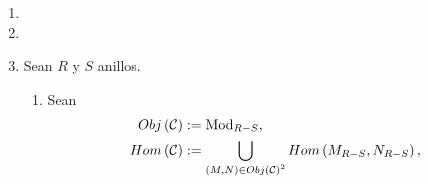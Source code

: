\documentclass{article}
\newcommand{\crdnlty}[1]{
	\left|#1\right|
}
\newcommand{\lrprth}[1]{
	\left(#1\right)
}
\newcommand{\lrbrack}[1]{
	\left\{#1\right\}
}
\newcommand{\fntuple}[3]{
	{\left({#1}_{#2}\right)}_{#2=1}^{#3}
}
\newcommand{\genmod}[2]{
	\left< #1\right>_{#2}
}
\newcommand{\ringmod}[3]{
	\if#3l
	{}_{#1}#2
	\else
	\if#3r
	#2_{#1}
	\fi
	\fi
}
\newcommand{\ringbimod}[4]{
	\if#4l
	{}_{#1-#2}#3
	\else
	\if#4r
	#3_{#1-#2}
	\else 
	\ifstrequal{#4}{lr}{
		{}_{#1}#3_{#2}
	}
	\fi
	\fi
}
\theoremstyle{definition}
\theoremstyle{plain}
\theoremstyle{plain}
\theoremstyle{definition}
\theoremstyle{definition}
\theoremstyle{definition}
\theoremstyle{definition}
\theoremstyle{definition}
\newtheorem{lem}{Lema}
\theoremstyle{definition}
\begin{document}
\begin{enumerate}[label=\textbf{Ej \arabic*.}]
\begin{proof}
\begin{proof}
\begin{align*}
			 \therefore\ & f\lrprth{\genmod{A}{R}} = \genmod{f(A)}{R}.
		\end{align*}
	\end{proof}
	\begin{lem}
		Sea $f:M\rightarrow N$ un epimorfismo de $R$-módulos a izquierda. Si $M\in\ringmod{R}{\text{mod}}{l}$ entonces $N\in\ringmod{R}{\text{mod}}{l}$.
	\end{lem}
	\begin{proof}
		Como $M\in\ringmod{R}{\text{mod}}{l}$ $\exists\ X\subseteq M$ finito tal que $M=\genmod{X}{R}$ y así
		\begin{align*}
			N&=f(M) && f\text{ es sobre}\\
			&=f\lrprth{\genmod{X}{R}}=\genmod{f(X)}{R} && \text{Lema 4}
		\end{align*}
	Y como $\crdnlty{f(X)}\leq\crdnlty{X}$ entonces $f(X)$ es finito. Por lo tanto $N\in\ringmod{R}{\text{mod}}{l}$.\\
	\end{proof}
	Así, como $\exists\ n\in\mathbb{N}\setminus\lrbrack{0}$ y $f:R^n\rightarrow M$ epimorfismo de $R$-módulos a izquierda, por el Lema 5 basta verificar que $R^n\in\ringmod{R}{\text{mod}}{l}$.\\
	Sean $e_j:=\lrprth{u_i^j}_{i=1}^n\in R^n$, donde
		\begin{equation*}
		u_i^j=\left\{
		\begin{tabular}{cc}
			$0_R$ & , $i\neq j$ \\
			$1_R$ & , $i=j$ 
		\end{tabular}
		\right. ,
	\end{equation*}
	$\forall\ j\in[1,n]$, y $E:=\lrbrack{e_1,\dotsc,e_n}$. Así si $\fntuple{r}{i}{n}\in R^n$, entonces $\fntuple{r}{i}{n}=\sum_{i=1}^{n}r_ie_i$, con lo cual $R^n=\genmod{E}{R}$. Por lo tanto $R^n\in\ringmod{R}{\text{mod}}{l}$.\\
\end{proof}
\item\item
\item Sean $R$ y $S$ anillos.
\begin{enumerate}[label=(\alph*)]
	\item Sean 
	\begin{align*}
		Obj\lrprth{\mathcal{C}}&:=\ringbimod{R}{S}{\text{Mod}}{r},\\
		Hom\lrprth{\mathcal{C}}&:=\bigcup_{\lrprth{M,N}\in Obj\lrprth{\mathcal{C}}^2}Hom\lrprth{\ringbimod{R}{S}{M}{r},\ringbimod{R}{S}{N}{r}},\\

\end{align*}
\end{enumerate}
\end{enumerate}
\end{document}
